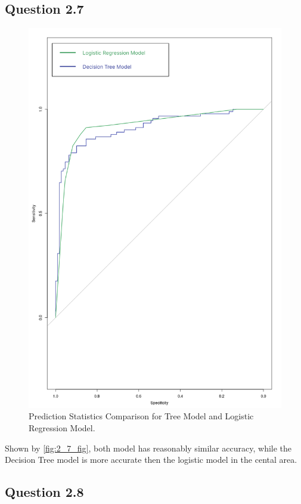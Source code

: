 \documentclass[parskip=full]{scrartcl}
\begin{document}
    \subsection*{Question 2.7}
    
    \begin{figure}
        \centering
        \includegraphics[width=0.9\linewidth]{diagrams/comp_test.png}
        \caption{Prediction Statistics Comparison for Tree Model and Logistic Regression Model.}
        \label{fig:2_7_fig}
    \end{figure}

    Shown by \autoref{fig:2_7_fig}, both model has reasonably similar accuracy, while the Decision Tree model is more accurate then the logistic model in the cental area.

    \subsection*{Question 2.8}
\end{document}
